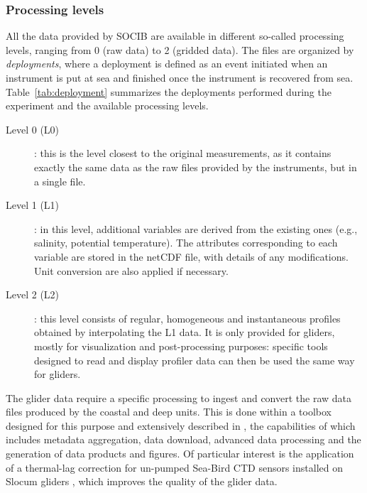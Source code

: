 \documentclass[essd]{copernicus}
\begin{document}
\subsubsection{Processing levels}

All the data provided by SOCIB are available in different so-called processing levels, ranging from 0 (raw data) to 2 (gridded data). The files are organized by \textit{deployments}, where a deployment is defined as an event initiated when an instrument is put at sea and finished once the instrument is recovered from sea. Table~\ref{tab:deployment} summarizes the deployments performed during the experiment and the available processing levels.

\begin{description}
\item[Level 0 (L0)]: this is the level closest to the original measurements, as it contains exactly the same data as the raw files provided by the instruments, but in a single file.
\item[Level 1 (L1)]: in this level, additional variables are derived from the existing ones (e.g., salinity, potential temperature). The attributes corresponding to each variable are stored in the netCDF file, with details of any modifications. Unit conversion are also applied if necessary.
\item[Level 2 (L2)]: this level consists of regular, homogeneous and instantaneous profiles obtained by interpolating the L1 data. It is only provided for gliders, mostly for visualization and post-processing purposes: specific tools designed to read and display profiler data can then be used the same way for gliders.
\end{description}
The glider data require a specific processing to ingest and convert the raw data files produced by the coastal and deep units. This is done within a toolbox designed for this purpose and extensively described in \citet{TROUPIN16}, the capabilities of which includes metadata aggregation, data download, advanced data processing and the generation of data products and figures. Of particular interest is the application of a thermal-lag correction for un-pumped Sea-Bird CTD sensors installed on Slocum gliders \citep{GARAU11}, which improves the quality of the glider data.
\end{document}
